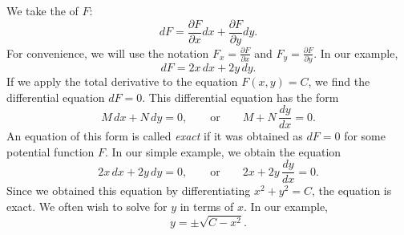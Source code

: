 We take the
\emph{} of
$F$:
\begin{equation*}
dF = \frac{\partial F}{\partial x} dx + \frac{\partial F}{\partial y} dy .
\end{equation*}
For convenience,
we will use the notation
$F_x = \frac{\partial F}{\partial x}$ and
$F_y = \frac{\partial F}{\partial y}$.
In our example,
\begin{equation*}
dF = 2x \, dx + 2y \, dy .
\end{equation*}
If we apply the total derivative to the equation $F(x,y) = C$, we find
the differential equation $dF = 0$.  This differential equation
has the form
\begin{equation*}
M \, dx + N \, dy = 0, \qquad
\text{or} \qquad
M + N \, \frac{dy}{dx} = 0 .
\end{equation*}
An equation of this form
is called \emph{exact} if it was obtained as $dF = 0$ for some potential
function $F$.
In our simple example, we obtain the equation
\begin{equation*}
2x \, dx + 2y \, dy = 0, \qquad
\text{or} \qquad
2x + 2y \, \frac{dy}{dx} = 0 .
\end{equation*}
Since we obtained this equation by differentiating $x^2+y^2=C$,
the equation is exact.
We often wish to solve for $y$ in terms of $x$.  In our example,
\begin{equation*}
y = \pm \sqrt{C-x^2} .
\end{equation*}

